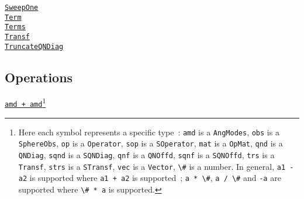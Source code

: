 \documentclass{timesjhep}
\begin{document}
\begin{multicols}{2}
    \href{https://docs.fuzzified.world/itensors/\#FuzzifiED.SweepOne-Tuple{String,\%20MPO,\%20MPS,\%20Int64}}{\lstinline|SweepOne|}\\
    \href{https://docs.fuzzified.world/core/\#FuzzifiED.Term}{\lstinline|Term|}\\
    \href{https://docs.fuzzified.world/core/\#FuzzifiED.Terms}{\lstinline|Terms|}\\
    \href{https://docs.fuzzified.world/core/\#FuzzifiED.Transf}{\lstinline|Transf|}\\
    \href{https://docs.fuzzified.world/itensors/\#FuzzifiED.TruncateQNDiag-Tuple{Vector{QNDiag}}}{\lstinline|TruncateQNDiag|}\\
    \subsection*{Operations}
    \noindent
    \href{https://docs.fuzzified.world/models/\#Base.:+-Tuple{AngModes,\%20AngModes}}{\lstinline|amd + amd|}\footnote{Here each symbol represents a specific type~: \lstinline[basicstyle=\ttfamily\scriptsize]|amd| is a \lstinline[basicstyle=\ttfamily\scriptsize]|AngModes|,  \lstinline[basicstyle=\ttfamily\scriptsize]|obs| is a \lstinline[basicstyle=\ttfamily\scriptsize]|SphereObs|, \lstinline[basicstyle=\ttfamily\scriptsize]|op| is a \lstinline[basicstyle=\ttfamily\scriptsize]|Operator|, \lstinline[basicstyle=\ttfamily\scriptsize]|sop| is a \lstinline[basicstyle=\ttfamily\scriptsize]|SOperator|, \lstinline[basicstyle=\ttfamily\scriptsize]|mat| is a \lstinline[basicstyle=\ttfamily\scriptsize]|OpMat|, \lstinline[basicstyle=\ttfamily\scriptsize]|qnd| is a \lstinline[basicstyle=\ttfamily\scriptsize]|QNDiag|, \lstinline[basicstyle=\ttfamily\scriptsize]|sqnd| is a  \lstinline[basicstyle=\ttfamily\scriptsize]|SQNDiag|, \lstinline[basicstyle=\ttfamily\scriptsize]|qnf| is a \lstinline[basicstyle=\ttfamily\scriptsize]|QNOffd|, \lstinline[basicstyle=\ttfamily\scriptsize]|sqnf| is a  \lstinline[basicstyle=\ttfamily\scriptsize]|SQNOffd|, \lstinline[basicstyle=\ttfamily\scriptsize]|trs| is a \lstinline[basicstyle=\ttfamily\scriptsize]|Transf|, \lstinline[basicstyle=\ttfamily\scriptsize]|strs| is a \lstinline[basicstyle=\ttfamily\scriptsize]|STransf|, \lstinline[basicstyle=\ttfamily\scriptsize]|vec| is a \lstinline[basicstyle=\ttfamily\scriptsize]|Vector|, \lstinline[basicstyle=\ttfamily\scriptsize]|\#| is a number. In general, \lstinline[basicstyle=\ttfamily\scriptsize]|a1 - a2| is supported where \lstinline[basicstyle=\ttfamily\scriptsize]|a1 + a2| is supported~; \lstinline[basicstyle=\ttfamily\scriptsize]|a * \#|, \lstinline[basicstyle=\ttfamily\scriptsize]|a / \#| and \lstinline[basicstyle=\ttfamily\scriptsize]|-a| are supported where \lstinline[basicstyle=\ttfamily\scriptsize]|\# * a| is supported.}\\

\end{multicols}
\end{document}
